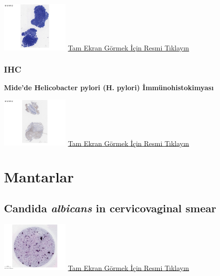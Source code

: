 \documentclass[
  letterpaper,
  DIV=11,
  numbers=noendperiod]{scrreprt}
\begin{document}
\href{https://images.patolojiatlasi.com/helicobacterpylori/giemsa.html}{\includegraphics[width=0.25\textwidth,height=\textheight]{./screenshots/helicobacterpyloriGiemsa_screenshot.png}}
\href{https://images.patolojiatlasi.com/helicobacterpylori/giemsa.html}{Tam
Ekran Görmek İçin Resmi Tıklayın}

\hypertarget{ihc}{%
\subsection{IHC}\label{ihc}}

\textbf{Mide'de Helicobacter pylori (H. pylori) İmmünohistokimyası}

\href{https://images.patolojiatlasi.com/helicobacterpylori/IHC.html}{\includegraphics[width=0.25\textwidth,height=\textheight]{./screenshots/helicobacterpyloriIHC_screenshot.png}}
\href{https://images.patolojiatlasi.com/helicobacterpylori/IHC.html}{Tam
Ekran Görmek İçin Resmi Tıklayın}

\hypertarget{sec-mantarlar}{%
\chapter{Mantarlar}\label{sec-mantarlar}}

\hypertarget{sec-candida-albicans-in-cervicovaginal-smear}{%
\section{\texorpdfstring{Candida \emph{albicans} in cervicovaginal
smear}{Candida albicans in cervicovaginal smear}}\label{sec-candida-albicans-in-cervicovaginal-smear}}

\href{https://images.patolojiatlasi.com/candidaalbicans/cervicovaginalsmear/viewer_z0.html}{\includegraphics[width=0.25\textwidth,height=\textheight]{./screenshots/candidaalbicans_screenshot.png}}
\href{https://images.patolojiatlasi.com/candidaalbicans/cervicovaginalsmear/viewer_z0.html}{Tam
Ekran Görmek İçin Resmi Tıklayın}
\end{document}
